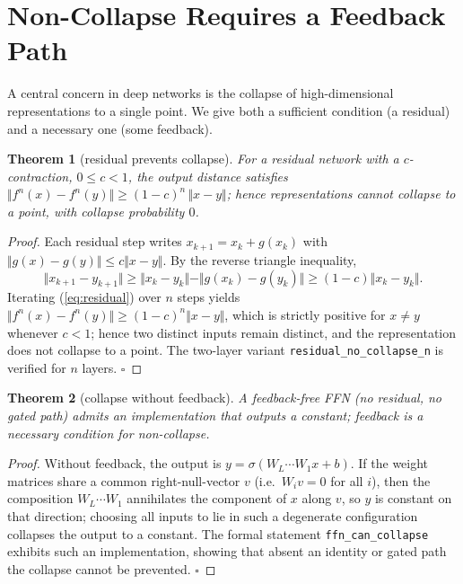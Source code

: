 \documentclass[journal]{IEEEtran}
\newtheorem{theorem}{Theorem}
\begin{document}
\section{Non-Collapse Requires a Feedback Path}
\label{sec:collapse}
A central concern in deep networks is the collapse of high-dimensional
representations to a single point. We give both a sufficient condition (a
residual) and a necessary one (some feedback).

\begin{theorem}[residual prevents collapse]
\label{thm:residual}
For a residual network with a $c$-contraction, $0\le c<1$, the output distance
satisfies $\Vert f^n(x)-f^n(y)\Vert \ge (1-c)^n\,\Vert x-y\Vert$; hence
representations cannot collapse to a point, with collapse probability $0$.
\end{theorem}

\begin{proof}
Each residual step writes $x_{k+1}=x_k+g(x_k)$ with $\Vert g(x)-g(y)\Vert\le
c\Vert x-y\Vert$. By the reverse triangle inequality,
\begin{equation}
\Vert x_{k+1}-y_{k+1}\Vert
\ge \Vert x_k-y_k\Vert-\Vert g(x_k)-g(y_k)\Vert
\ge (1-c)\Vert x_k-y_k\Vert.
\label{eq:residual}
\end{equation}
Iterating (\ref{eq:residual}) over $n$ steps yields
$\Vert f^n(x)-f^n(y)\Vert\ge(1-c)^n\Vert x-y\Vert$, which is strictly positive
for $x\neq y$ whenever $c<1$; hence two distinct inputs remain distinct, and
the representation does not collapse to a point. The two-layer variant
\texttt{residual\_no\_collapse\_n} is verified for $n$ layers.
\hfill$\square$
\end{proof}

\begin{theorem}[collapse without feedback]
\label{thm:collapse}
A feedback-free FFN (no residual, no gated path) admits an implementation that
outputs a constant; feedback is a necessary condition for non-collapse.
\end{theorem}

\begin{proof}
Without feedback, the output is $y=\sigma(W_L\cdots W_1 x+b)$. If the weight
matrices share a common right-null-vector $v$ (i.e.\ $W_i v=0$ for all $i$), then
the composition $W_L\cdots W_1$ annihilates the component of $x$ along $v$, so
$y$ is constant on that direction; choosing all inputs to lie in such a
degenerate configuration collapses the output to a constant. The formal
statement \texttt{ffn\_can\_collapse} exhibits such an implementation, showing
that absent an identity or gated path the collapse cannot be prevented.
\hfill$\square$
\end{proof}
\end{document}
